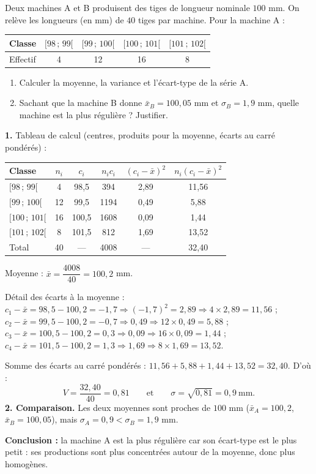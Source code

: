 \documentclass[11pt]{article}
\begin{document}
\begin{exoresolu}
Deux machines A et B produisent des tiges de longueur nominale $100$ mm. On relève les longueurs (en mm) de $40$ tiges par machine. Pour la machine A :
\begin{center}
\begin{tabular}{|l|cccc|}
\hline
\rowcolor{popblueL} Classe & $[98\,;\,99[$ & $[99\,;\,100[$ & $[100\,;\,101[$ & $[101\,;\,102[$ \\
\hline
Effectif & 4 & 12 & 16 & 8 \\
\hline
\end{tabular}
\end{center}
\begin{enumerate}
\item Calculer la moyenne, la variance et l'écart-type de la série A.
\item Sachant que la machine B donne $\bar{x}_B=100{,}05$ mm et $\sigma_B=1{,}9$ mm, quelle machine est la plus régulière ? Justifier.
\end{enumerate}
\tcblower
\textbf{1.} Tableau de calcul (centres, produits pour la moyenne, écarts au carré pondérés) :
\begin{center}
\begin{tabular}{|l|c|c|c|c|c|}
\hline
\rowcolor{popblueL} Classe & $n_i$ & $c_i$ & $n_ic_i$ & $(c_i-\bar{x})^2$ & $n_i(c_i-\bar{x})^2$ \\
\hline
$[98\,;\,99[$ & 4 & 98{,}5 & 394 & 2{,}89 & 11{,}56 \\
\hline
$[99\,;\,100[$ & 12 & 99{,}5 & 1194 & 0{,}49 & 5{,}88 \\
\hline
$[100\,;\,101[$ & 16 & 100{,}5 & 1608 & 0{,}09 & 1{,}44 \\
\hline
$[101\,;\,102[$ & 8 & 101{,}5 & 812 & 1{,}69 & 13{,}52 \\
\hline
\rowcolor{popcream} Total & 40 & --- & 4008 & --- & 32{,}40 \\
\hline
\end{tabular}
\end{center}
Moyenne : $\bar{x}=\dfrac{4008}{40}=100{,}2$ mm.
\smallskip

Détail des écarts à la moyenne :
$c_1-\bar{x}=98{,}5-100{,}2=-1{,}7 \Rightarrow (-1{,}7)^2=2{,}89 \Rightarrow 4\times 2{,}89=11{,}56$ ;
$c_2-\bar{x}=99{,}5-100{,}2=-0{,}7 \Rightarrow 0{,}49 \Rightarrow 12\times 0{,}49=5{,}88$ ;
$c_3-\bar{x}=100{,}5-100{,}2=0{,}3 \Rightarrow 0{,}09 \Rightarrow 16\times 0{,}09=1{,}44$ ;
$c_4-\bar{x}=101{,}5-100{,}2=1{,}3 \Rightarrow 1{,}69 \Rightarrow 8\times 1{,}69=13{,}52$.
\smallskip

Somme des écarts au carré pondérés : $11{,}56+5{,}88+1{,}44+13{,}52=32{,}40$.
D'où :
\[ V=\dfrac{32{,}40}{40}=0{,}81 \qquad\text{et}\qquad \sigma=\sqrt{0{,}81}=0{,}9\ \text{mm}. \]
\textbf{2. Comparaison.} Les deux moyennes sont proches de $100$ mm ($\bar{x}_A=100{,}2$, $\bar{x}_B=100{,}05$), mais $\sigma_A=0{,}9 < \sigma_B=1{,}9$ mm.
\smallskip

\textbf{Conclusion :} la machine A est la plus régulière car son écart-type est le plus petit : ses productions sont plus concentrées autour de la moyenne, donc plus homogènes.
\end{exoresolu}
\end{document}
